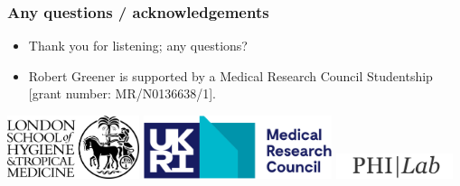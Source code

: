 \documentclass[aspectratio=169]{beamer}
\begin{document}
\begin{frame}
    \frametitle{Any questions / acknowledgements}
    \begin{itemize}
        \item Thank you for listening; any questions?
        \item Robert Greener is supported by a Medical Research Council Studentship [grant number: MR/N0136638/1].
    \end{itemize}
    \vspace*{4em}
    \includegraphics[height=5em]{figures/LSHTM-logo-bw.jpg}
    \includegraphics[height=5em]{figures/Medical_Research_Council_logo.svg.png}
    \includegraphics[height=2em]{figures/philab.png}
\end{frame}
\end{document}
